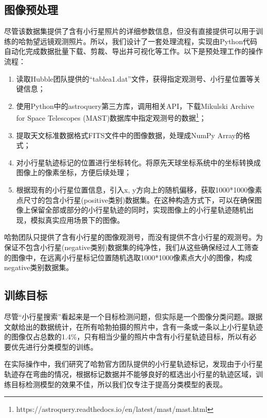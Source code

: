 \documentclass[12pt,a4paper]{article}%
\begin{document}
\subsection{图像预处理}

尽管该数据集提供了含有小行星照片的详细参数信息，但没有直接提供可以用于训练的哈勃望远镜观测照片。所以，我们设计了一套处理流程，实现由Python代码自动化完成数据批量下载、剪裁、导出并可视化等工作。以下是预处理工作的操作流程：

\begin{enumerate}[1.]%
    \item 读取Hubble团队提供的“tablea1.dat”文件，获得指定观测号、小行星位置等关键信息；
    \item 使用Python中的astroquery第三方库，调用相关API，下载Mikulski Archive for Space Telescopes (MAST)数据库中指定观测号的数据\footnote{https://astroquery.readthedocs.io/en/latest/mast/mast.html}；
    \item 提取天文标准数据格式FITS文件中的图像数据，处理成NumPy Array的格式；
    \item 对小行星轨迹标记的位置进行坐标转化。将原先天球坐标系统中的坐标转换成图像上的像素坐标，方便后续处理；
    \item 根据现有的小行星位置信息，引入x, y方向上的随机偏移，获取1000*1000像素点尺寸的包含小行星(positive类别)数据集。在这种构造方式下，可以在确保图像上保留全部或部分的小行星轨迹的同时，实现图像上的小行星轨迹随机出现，模拟真实应用场景下的图像。
\end{enumerate}

哈勃团队只提供了含有小行星的图像观测号，而没有提供不含小行星的观测号。为保证不包含小行星(negative类别)数据集的纯净性，我们从这些确保经过人工筛查的图像中，在远离小行星标记位置随机选取1000*1000像素点大小的图像，构成negative类别数据集。

\subsection{训练目标}

尽管“小行星搜索”看起来是一个目标检测问题，但实际是一个图像分类问题。跟据文献给出的数据统计，在所有哈勃拍摄的照片中，含有一条或一条以上小行星轨迹的图像仅占总数的1.4\%，只有相当少量的照片中含有小行星轨迹目标，所以有必要优先进行分类模型的训练。

在实际操作中，我们研究了哈勃官方团队提供的小行星轨迹标记，发现由于小行星轨迹存在弯曲的情况，根据标记数据并不能够良好的框选出小行星的轨迹区域，训练目标检测模型的效果不佳，所以我们仅专注于提高分类模型的表现。
\end{document}
